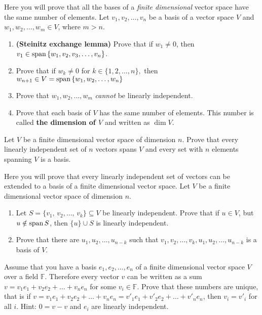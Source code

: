 \begin{prob}
  Here you will prove that all the bases of a \textit{finite dimensional} vector space have the same number of elements. Let $v_1, v_2,\dots, v_n$ be a basis of a vector space $V$ and $w_1,w_2,\dots,w_m\in V$, where $m > n$.
  \begin{enumerate}
    \item \textbf{(Steinitz exchange lemma)} Prove that if $w_1\neq 0$, then $v_1\in \text{span\,} \{w_1, v_2, v_3, \dots,v_n\}$.
    \item Prove that if $w_k\neq 0$ for $k\in\{1, 2, \dots, n\},$ then $w_{n+1}\in V=\text{span\,}\{w_1, w_2, \dots, w_n\}$
    \item Prove that $w_1, w_2, \dots, w_m$ \textit{cannot} be linearly independent.
    \item Prove that each basis of $V$ has the same number of elements. This number is called \textbf{the dimension of $V$} and written as $\dim V$.
  \end{enumerate}
\end{prob}

\begin{prob}
  Let $V$ be a finite dimensional vector space of dimension $n$. Prove that every linearly independent set of $n$ vectors spans $V$ and every set with $n$ elements spanning $V$
  is a basis.
\end{prob}

\begin{prob}
  Here you will prove that every linearly independent set of vectors can be extended to a basis of a finite dimensional vector space. Let $V$ be a finite dimensional vector space
  of dimension $n$.
  \begin{enumerate}
    \item Let $S=\{v_1,\, v_2,\dots,\, v_k\}\subseteq V$ be linearly independent. Prove that if $u\in V$, but $u\notin \text{span\,} S$, then $\{u\}\cup S$ is linearly independent.
    \item Prove that there are $u_1, u_2, \dots,u_{n-k}$ such that $v_1, v_2, \dots, v_k, u_1, u_2,\dots, u_{n-k}$ is a basis of $V$.
  \end{enumerate}
\end{prob}

\begin{prob}
  Assume that you have a basis $e_1, e_2,\dots,e_n$ of a finite dimensional vector space $V$ over a field $\mathbb F$. Therefore every vector $v$ can be written as a sum
  $v=v_1e_1+v_2e_2+\dots+v_ne_n$ for some $v_i\in \mathbb F$. Prove that these numbers are unique, that is if $v=v_1e_1+v_2e_2+\dots+v_ne_n=v'_1e_1+v'_2e_2+\dots+v'_ne_n$, then
  $v_i=v'_i$ for all $i$. Hint: $0=v-v$ and $e_i$ are linearly independent.
\end{prob}

